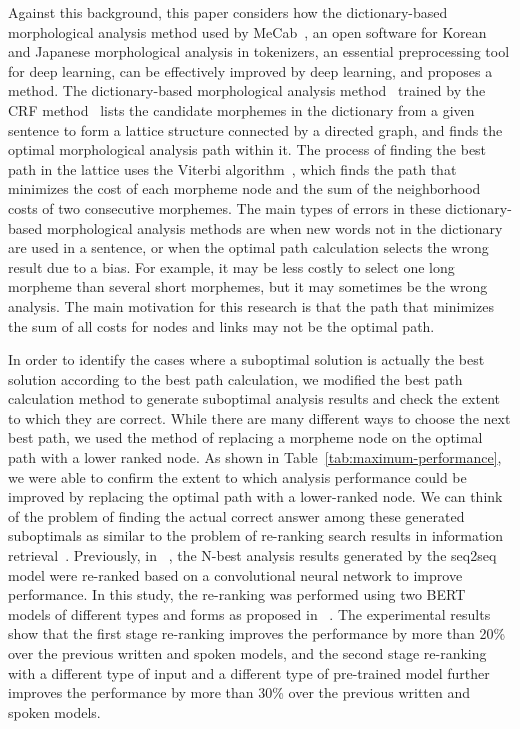 \documentclass[AMS,STIX2COL]{WileyNJD-v2}
\begin{document}
    Against this background, this paper considers how the dictionary-based morphological analysis method used by MeCab~\cite{MeCab}, an open software for Korean and Japanese morphological analysis in tokenizers, an essential preprocessing tool for deep learning, can be effectively improved by deep learning, and proposes a method.
    The dictionary-based morphological analysis method~\cite{Kudo2004, NaSH2014, NaSH2015, NaSH2018} trained by the CRF method~\cite{Lafferty2001} lists the candidate morphemes in the dictionary from a given sentence to form a lattice structure connected by a directed graph, and finds the optimal morphological analysis path within it.
    The process of finding the best path in the lattice uses the Viterbi algorithm~\cite{Viterbi1967}, which finds the path that minimizes the cost of each morpheme node and the sum of the neighborhood costs of two consecutive morphemes.
    The main types of errors in these dictionary-based morphological analysis methods are when new words not in the dictionary are used in a sentence, or when the optimal path calculation selects the wrong result due to a bias.
    For example, it may be less costly to select one long morpheme than several short morphemes, but it may sometimes be the wrong analysis.
    The main motivation for this research is that the path that minimizes the sum of all costs for nodes and links may not be the optimal path.

    In order to identify the cases where a suboptimal solution is actually the best solution according to the best path calculation, we modified the best path calculation method to generate suboptimal analysis results and check the extent to which they are correct.
    While there are many different ways to choose the next best path, we used the method of replacing a morpheme node on the optimal path with a lower ranked node.
    As shown in Table~\ref{tab:maximum-performance}, we were able to confirm the extent to which analysis performance could be improved by replacing the optimal path with a lower-ranked node.
    We can think of the problem of finding the actual correct answer among these generated suboptimals as similar to the problem of re-ranking search results in information retrieval~\cite{BaeYJ2021}.
    Previously, in ~\cite{ChoiYS2018}, the N-best analysis results generated by the seq2seq model were re-ranked based on a convolutional neural network to improve performance.
    In this study, the re-ranking was performed using two BERT models of different types and forms as proposed in ~\cite{Nogueira2019}.
    The experimental results show that the first stage re-ranking improves the performance by more than 20\% over the previous written and spoken models, and the second stage re-ranking with a different type of input and a different type of pre-trained model further improves the performance by more than 30\% over the previous written and spoken models.
\end{document}
